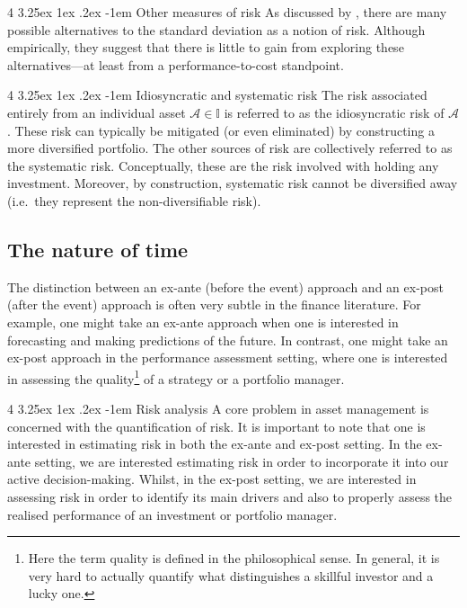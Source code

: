 \documentclass[12pt]{article}
\makeatletter
\renewcommand\paragraph{%
	\@startsection{paragraph}
	{4}
	{\z@}
	{3.25ex \@plus1ex \@minus.2ex}
	{-1em}
	{\normalfont\normalsize\bfseries\maybe@addperiod}%
}
\newcommand{\maybe@addperiod}[1]{%
	#1\@addpunct{.}%
}
\makeatother
\begin{document}
\paragraph{Other measures of risk} As discussed by \citet[Chapter 3]{grinold1999}, there are many possible alternatives to the standard deviation as a notion of risk. Although empirically, they suggest that there is little to gain from exploring these alternatives---at least from a performance-to-cost standpoint.

\paragraph{Idiosyncratic and systematic risk} The risk associated entirely from an individual asset $\mathcal{A} \in \mathbb{I}$ is referred to as the idiosyncratic risk of $\mathcal{A}$. These risk can typically be mitigated (or even eliminated) by constructing a more diversified portfolio. The other sources of risk are collectively referred to as the systematic risk. Conceptually, these are the risk involved with holding any investment. Moreover, by construction, systematic risk cannot be diversified away (i.e.\ they represent the non-diversifiable risk).
\subsection{The nature of time}
The distinction between an ex-ante (before the event) approach and an ex-post (after the event) approach is often very subtle in the finance literature. For example, one might take an ex-ante approach when one is interested in forecasting and making predictions of the future. In contrast, one might take an ex-post approach in the performance assessment setting, where one is interested in assessing the quality\footnote{Here the term quality is defined in the philosophical sense. In general, it is very hard to actually quantify what distinguishes a skillful investor and a lucky one.} of a strategy or a portfolio manager.

\paragraph{Risk analysis} A core problem in asset management is concerned with the quantification of risk. It is important to note that one is interested in estimating risk in both the ex-ante and ex-post setting. In the ex-ante setting, we are interested estimating risk in order to incorporate it into our active decision-making. Whilst, in the ex-post setting, we are interested in assessing risk in order to identify its main drivers and also to properly assess the realised performance of an investment or portfolio manager.
\end{document}
